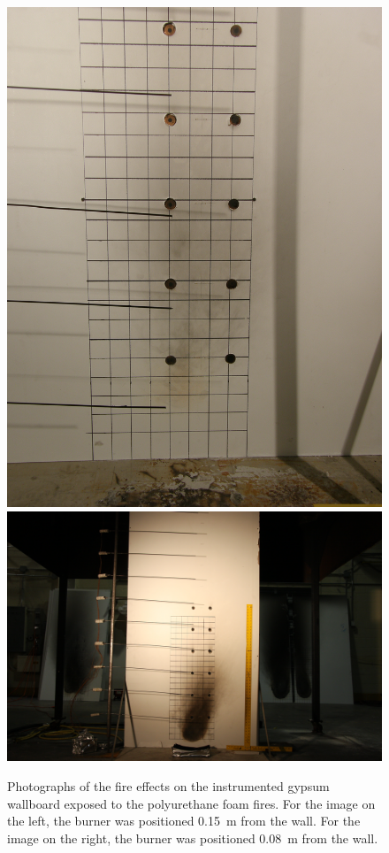 \documentclass[twoside]{uocthesis}
\begin{document}
\begin{figure}[p]
	\centering
	\includegraphics[trim=0.0in 0.0in 0.0in 0.0in, clip=true, width=0.4\columnwidth]{../Figures/IWGB_PUF5_0_15m}
	\includegraphics[trim=20.0in 1.0in 20.0in 16.4in, clip=true, width=0.4\columnwidth]{../Figures/IWGB_PUF12_0_8m} \\
	\caption[Photographs of the fire effects on the instrumented gypsum wallboard exposed to the polyurethane foam fires]{Photographs of the fire effects on the instrumented gypsum wallboard exposed to the polyurethane foam fires. For the image on the left, the burner was positioned 0.15~m from the wall.  For the image on the right, the burner was positioned 0.08~m from the wall.}
	\label{IWGB_PUF_patterns}
\end{figure}
\end{document}
